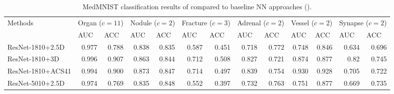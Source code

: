 \begin{table*}[]
    \centering
    \caption[MedMNIST classification results of compared to baseline \ac{nn} approaches.]{MedMNIST classification results of compared to baseline NN approaches (\citep{medmnist}).} \label{tab:medmnist}
    \begin{adjustbox}{angle=90}
\begin{tabular}{|l|rr|rr|rr|rr|rr|rr|}
\hline
\multirow{2}{*}{Methods}                & \multicolumn{2}{c}{Organ ($c=11$)}                  & \multicolumn{2}{c}{Nodule ($c=2$)}                 & \multicolumn{2}{c}{Fracture ($c=3$)}               & \multicolumn{2}{c}{Adrenal ($c=2$)}                & \multicolumn{2}{c}{Vessel ($c=2$)}                 & \multicolumn{2}{c|}{Synapse ($c=2$)}                \\
                         & \multicolumn{1}{l}{AUC} & \multicolumn{1}{l}{ACC} & \multicolumn{1}{l}{AUC} & \multicolumn{1}{l}{ACC} & \multicolumn{1}{l}{AUC} & \multicolumn{1}{l}{ACC} & \multicolumn{1}{l}{AUC} & \multicolumn{1}{l}{ACC} & \multicolumn{1}{l}{AUC} & \multicolumn{1}{l}{ACC} & \multicolumn{1}{l}{AUC} & \multicolumn{1}{l|}{ACC} \\ \hline
ResNet-1810+2.5D        & 0.977                   & 0.788                   & 0.838                   & 0.835                   & 0.587                   & 0.451                   & 0.718                   & 0.772                   & 0.748                   & 0.846                   & 0.634                   & 0.696                   \\
ResNet-1810+3D          & 0.996                   & 0.907                   & 0.863                   & 0.844                   & 0.712                   & 0.508                   & 0.827                   & 0.721                   & 0.874                   & 0.877                   & 0.82                    & 0.745                   \\
ResNet-1810+ACS41       & 0.994                   & 0.900                     & 0.873                   & 0.847                   & 0.714                   & 0.497                   & 0.839                   & 0.754                   & 0.930                    & 0.928                   & 0.705                   & 0.722                   \\
ResNet-5010+2.5D        & 0.974                   & 0.769                   & 0.835                   & 0.848                   & 0.552                   & 0.397                   & 0.732                   & 0.763                   & 0.751                   & 0.877                   & 0.669                   & 0.735                   \\

\end{tabular}
\end{adjustbox}
\end{table*}

